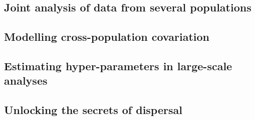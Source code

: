 \documentclass[
]{book}
\begin{document}
\hypertarget{joint-analysis-of-data-from-several-populations}{%
\subsection{Joint analysis of data from several populations}\label{joint-analysis-of-data-from-several-populations}}

\hypertarget{modelling-cross-population-covariation}{%
\subsection{Modelling cross-population covariation}\label{modelling-cross-population-covariation}}

\hypertarget{estimating-hyper-parameters-in-large-scale-analyses}{%
\subsection{Estimating hyper-parameters in large-scale analyses}\label{estimating-hyper-parameters-in-large-scale-analyses}}

\hypertarget{unlocking-the-secrets-of-dispersal}{%
\subsection{Unlocking the secrets of dispersal}\label{unlocking-the-secrets-of-dispersal}}

  
\end{document}

